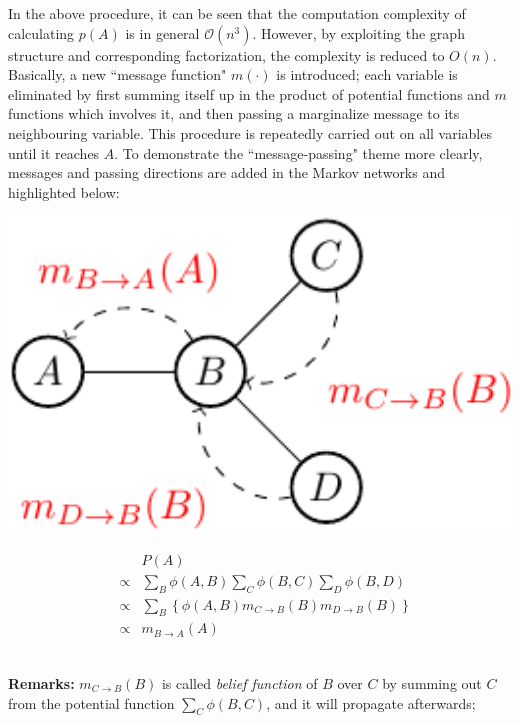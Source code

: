 In the above procedure, it can be seen that the computation complexity of calculating $p(A)$ is in general $\mathcal{O}(n^3)$. However, by exploiting 
the graph structure and corresponding factorization, the complexity is reduced to $O(n)$. Basically, a new ``message function" $m(\cdot)$ is introduced; 
each variable is eliminated by first summing 
itself up in the product of potential functions and $m$ functions which involves it, and then passing a marginalize message to its neighbouring variable. 
This procedure is repeatedly carried out 
on all variables until it reaches $A$. To demonstrate the ``message-passing" theme more clearly,  messages and passing directions are added in the Markov networks and  
highlighted below:
\newline
\begin{minipage}[c]{0.4\textwidth}
      \centering
      \includegraphics[width=1.1\textwidth]{./Figures/message_passing_1}
\end{minipage}
\begin{minipage}[c]{0.6\textwidth}
 \begin{equation*}
  \begin{array}{rcl}
  & & P(A) \\
  &\propto& \sum_{B}\phi(A,B) \sum_C \phi(B,C) \sum_D \phi(B,D)\\ 
  &\propto& \sum_{B} \left\{\phi(A,B) m_{C\rightarrow B}(B) m_{D\rightarrow B}(B) \right\} \\
  &\propto& m_{B\rightarrow A}(A)
  \end{array}
 \end{equation*}
\end{minipage}\\
\newline 
\textbf{Remarks:}
$m_{C\rightarrow B}(B)$ is called \emph{belief function} of $B$ over $C$ by summing out $C$ from the potential function $\sum_C \phi(B,C)$, and it will propagate afterwards; 

